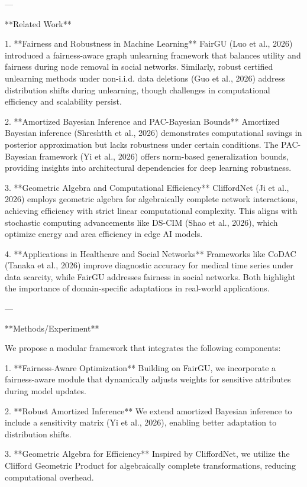 ---

**Related Work**

1. **Fairness and Robustness in Machine Learning**  
   FairGU (Luo et al., 2026) introduced a fairness-aware graph unlearning framework that balances utility and fairness during node removal in social networks. Similarly, robust certified unlearning methods under non-i.i.d. data deletions (Guo et al., 2026) address distribution shifts during unlearning, though challenges in computational efficiency and scalability persist.

2. **Amortized Bayesian Inference and PAC-Bayesian Bounds**  
   Amortized Bayesian inference (Shreshtth et al., 2026) demonstrates computational savings in posterior approximation but lacks robustness under certain conditions. The PAC-Bayesian framework (Yi et al., 2026) offers norm-based generalization bounds, providing insights into architectural dependencies for deep learning robustness.

3. **Geometric Algebra and Computational Efficiency**  
   CliffordNet (Ji et al., 2026) employs geometric algebra for algebraically complete network interactions, achieving efficiency with strict linear computational complexity. This aligns with stochastic computing advancements like DS-CIM (Shao et al., 2026), which optimize energy and area efficiency in edge AI models.

4. **Applications in Healthcare and Social Networks**  
   Frameworks like CoDAC (Tanaka et al., 2026) improve diagnostic accuracy for medical time series under data scarcity, while FairGU addresses fairness in social networks. Both highlight the importance of domain-specific adaptations in real-world applications.

---

**Methods/Experiment**

We propose a modular framework that integrates the following components:

1. **Fairness-Aware Optimization**  
   Building on FairGU, we incorporate a fairness-aware module that dynamically adjusts weights for sensitive attributes during model updates.

2. **Robust Amortized Inference**  
   We extend amortized Bayesian inference to include a sensitivity matrix (Yi et al., 2026), enabling better adaptation to distribution shifts.

3. **Geometric Algebra for Efficiency**  
   Inspired by CliffordNet, we utilize the Clifford Geometric Product for algebraically complete transformations, reducing computational overhead.

